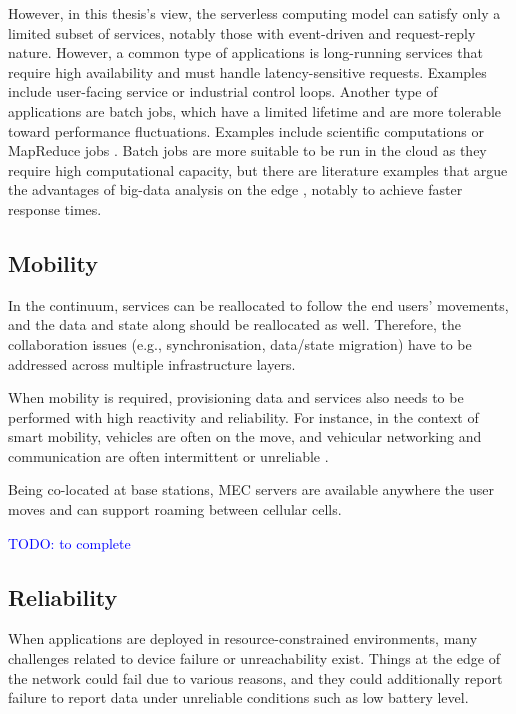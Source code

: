 However, in this thesis's view, the serverless computing model can satisfy only a limited subset of services, notably those with event-driven and request-reply nature. However, a common type of applications is long-running services that require high availability and must handle latency-sensitive requests. Examples include user-facing service or industrial control loops. Another type of applications are batch jobs, which have a limited lifetime and are more tolerable toward performance fluctuations. Examples include scientific computations or MapReduce jobs \cite{map-reduce}. Batch jobs are more suitable to be run in the cloud as they require high computational capacity, but there are literature examples that argue the advantages of big-data analysis on the edge \cite{data-analytics-iot}, notably to achieve faster response times.

\subsection{Mobility}

In the continuum, services can be reallocated to follow the end users' movements, and the data and state along should be reallocated as well. Therefore, the collaboration issues (e.g., synchronisation, data/state migration) have to be addressed across multiple infrastructure layers.

When mobility is required, provisioning data and services also needs to be performed with high reactivity and reliability. For instance, in the context of smart mobility, vehicles are often on the move, and vehicular networking and communication are often intermittent or unreliable \cite{vehicular-data-cloud}.

Being co-located at base stations, MEC servers are available anywhere the user moves and can support roaming between cellular cells.

\textcolor{blue}{TODO: to complete}

\subsection{Reliability}

When applications are deployed in resource-constrained environments, many challenges related to device failure or unreachability exist. Things at the edge of the network could fail due to various reasons, and they could additionally report failure to report data under unreliable conditions such as low battery level.

